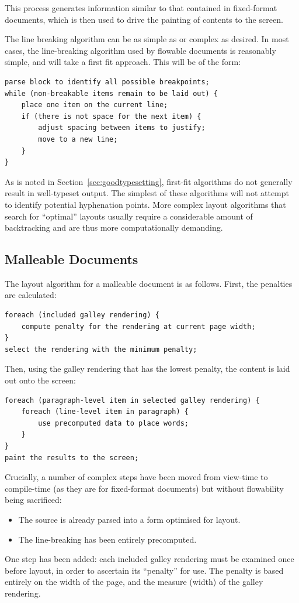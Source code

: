 This process generates information similar to that contained in fixed-format documents, which is then used to drive the painting of contents to the screen.

The line breaking algorithm can be as simple as or complex as desired. In most cases, the line-breaking algorithm used by flowable documents is reasonably simple, and will take a first fit approach. This will be of the form:

{\singlespacing
\begin{lstlisting}
parse block to identify all possible breakpoints;
while (non-breakable items remain to be laid out) {
    place one item on the current line;
    if (there is not space for the next item) {
        adjust spacing between items to justify;
        move to a new line;
    }
}
\end{lstlisting}
}

As is noted in Section~\ref{sec:goodtypesetting}, first-fit algorithms do not generally result in well-typeset output. The simplest of these algorithms will not attempt to identify potential hyphenation points. More complex layout algorithms that search for ``optimal'' layouts usually require a considerable amount of backtracking and are thus more computationally demanding.

\subsection{Malleable Documents}

The layout algorithm for a malleable document is as follows. First, the penalties are calculated:

{\singlespacing
\begin{lstlisting}
foreach (included galley rendering) {
    compute penalty for the rendering at current page width;
}
select the rendering with the minimum penalty;
\end{lstlisting}
}


Then, using the \gls{galley} rendering that has the lowest penalty, the content is laid out onto the screen:

{\singlespacing
\begin{lstlisting}
foreach (paragraph-level item in selected galley rendering) {
    foreach (line-level item in paragraph) {
        use precomputed data to place words;
    }
}
paint the results to the screen;
\end{lstlisting}
}
Crucially, a number of complex steps have been moved from view-time to compile-time (as they are for fixed-format documents) but without flowability being sacrificed:
\begin{itemize}
 \item The source is already parsed into a form optimised for layout.
 \item The line-breaking has been entirely precomputed.
\end{itemize}
One step has been added: each included \gls{galley} rendering must be examined once before layout, in order to ascertain its ``penalty'' for use. The penalty is based entirely on the width of the page, and the \gls{measure} (width) of the \gls{galley} rendering.%

